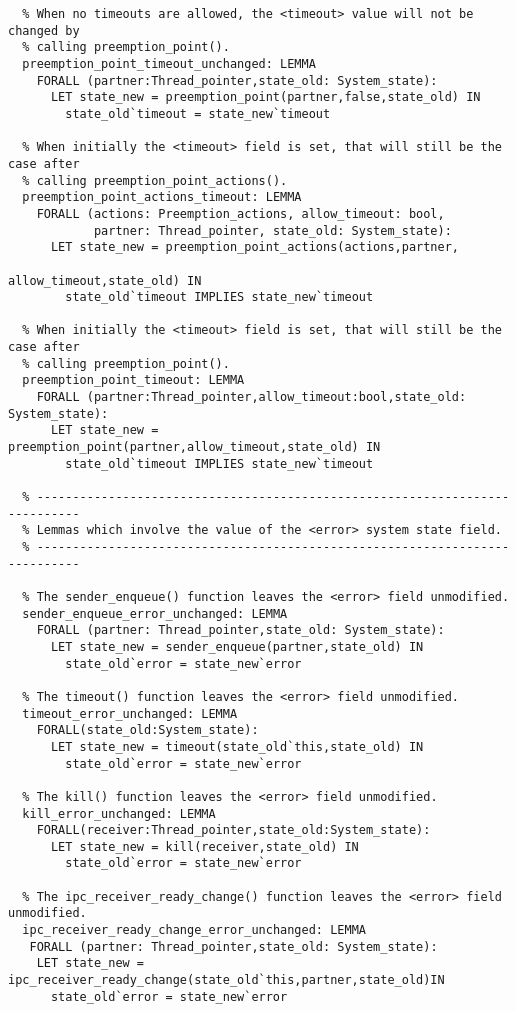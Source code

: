 \begin{lstlisting}
  % When no timeouts are allowed, the <timeout> value will not be changed by
  % calling preemption_point().
  preemption_point_timeout_unchanged: LEMMA
    FORALL (partner:Thread_pointer,state_old: System_state):
      LET state_new = preemption_point(partner,false,state_old) IN
        state_old`timeout = state_new`timeout

  % When initially the <timeout> field is set, that will still be the case after
  % calling preemption_point_actions().
  preemption_point_actions_timeout: LEMMA
    FORALL (actions: Preemption_actions, allow_timeout: bool,
            partner: Thread_pointer, state_old: System_state):
      LET state_new = preemption_point_actions(actions,partner,
                                               allow_timeout,state_old) IN
        state_old`timeout IMPLIES state_new`timeout

  % When initially the <timeout> field is set, that will still be the case after
  % calling preemption_point().
  preemption_point_timeout: LEMMA
    FORALL (partner:Thread_pointer,allow_timeout:bool,state_old: System_state):
      LET state_new = preemption_point(partner,allow_timeout,state_old) IN
        state_old`timeout IMPLIES state_new`timeout

  % ----------------------------------------------------------------------------
  % Lemmas which involve the value of the <error> system state field.
  % ----------------------------------------------------------------------------

  % The sender_enqueue() function leaves the <error> field unmodified.
  sender_enqueue_error_unchanged: LEMMA 
    FORALL (partner: Thread_pointer,state_old: System_state):
      LET state_new = sender_enqueue(partner,state_old) IN
        state_old`error = state_new`error

  % The timeout() function leaves the <error> field unmodified.
  timeout_error_unchanged: LEMMA
    FORALL(state_old:System_state):
      LET state_new = timeout(state_old`this,state_old) IN
        state_old`error = state_new`error

  % The kill() function leaves the <error> field unmodified.
  kill_error_unchanged: LEMMA
    FORALL(receiver:Thread_pointer,state_old:System_state):
      LET state_new = kill(receiver,state_old) IN
        state_old`error = state_new`error

  % The ipc_receiver_ready_change() function leaves the <error> field unmodified.
  ipc_receiver_ready_change_error_unchanged: LEMMA
   FORALL (partner: Thread_pointer,state_old: System_state):
    LET state_new = ipc_receiver_ready_change(state_old`this,partner,state_old)IN
      state_old`error = state_new`error


\end{lstlisting}
